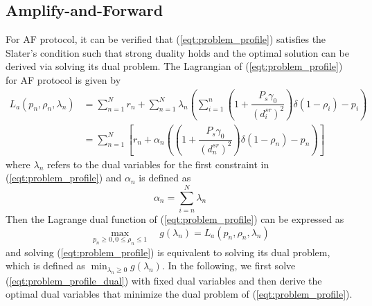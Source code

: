 \documentclass[12pt, draftclsnofoot, onecolumn]{IEEEtran}
\begin{document}
\subsection{Amplify-and-Forward} 
For AF protocol, it can be verified that (\ref{eqt:problem_profile}) satisfies the Slater’s condition such that strong duality holds and the optimal solution can be derived via solving its dual problem\cite{Boyd:2004:CO:993483}. The Lagrangian of (\ref{eqt:problem_profile}) for AF protocol is given by
\begin{equation}
\begin{aligned}
L_{a}(p_{n},\rho_{n},\lambda_{n})&=\sum\limits_{n=1}^{N}r_{n}+\sum\limits_{n=1}^{N}\lambda_{n}(\sum\limits _{i=1}^{n}(1+\dfrac{P_{s}\gamma_{0}}{(d^{sr}_{i})^{2}})\delta(1-\rho_{i})-p_{i})\\
&=\sum\limits_{n=1}^{N}[r_{n}+\alpha_{n}((1+\dfrac{P_{s}\gamma_{0}}{(d^{sr}_{n})^{2}})\delta(1-\rho_{n})-p_{n})]
\end{aligned}
\end{equation}
where $\lambda_{n}$ refers to the dual variables for the first constraint in (\ref{eqt:problem_profile}) and $\alpha_{n}$ is defined as
\begin{equation}
\alpha_{n}=\sum\limits_{i=n}^{N}\lambda_{n}
\end{equation}
Then the Lagrange dual function of (\ref{eqt:problem_profile}) can be expressed as 
\begin{equation}\label{eqt:problem_profile_dual}
\max\limits_{p_{n}\geq 0,0\leq\rho_{n}\leq 1}\quad g(\lambda_{n})=L_{a}(p_{n},\rho_{n},\lambda_{n})
\end{equation}
and solving (\ref{eqt:problem_profile}) is equivalent to solving its dual problem, which is defined as $\min _{\lambda_{n}\geq 0}g(\lambda _{n})$. In the following, we first solve (\ref{eqt:problem_profile_dual}) with fixed dual variables and then derive the optimal dual variables that minimize the dual problem of (\ref{eqt:problem_profile}).
\end{document}

